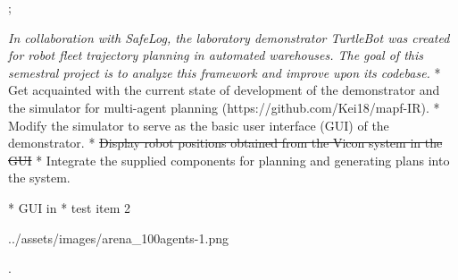 \usepackage{ulem}


\worktype[B/EN]
\slideshow



\pg;


\textit {
    In collaboration with SafeLog, the laboratory demonstrator TurtleBot was created
    for robot fleet trajectory planning in automated warehouses. The goal of this semestral
    project is to analyze this framework and improve upon its codebase.
}
\begitems
* Get acquainted with the current state of development of the demonstrator and the simulator for multi-agent planning (https://github.com/Kei18/mapf-IR).
* Modify the simulator to serve as the basic user interface (GUI) of the demonstrator.
* \sout{Display robot positions obtained from the Vicon system in the GUI}
* Integrate the supplied components for planning and generating plans into the system.
\enditems
\nl


\begitems
* GUI in 
* test item 2
\enditems
\nl

\centerline{\picw=14cm \inspic ../assets/images/arena_100agents-1.png }


\pg.